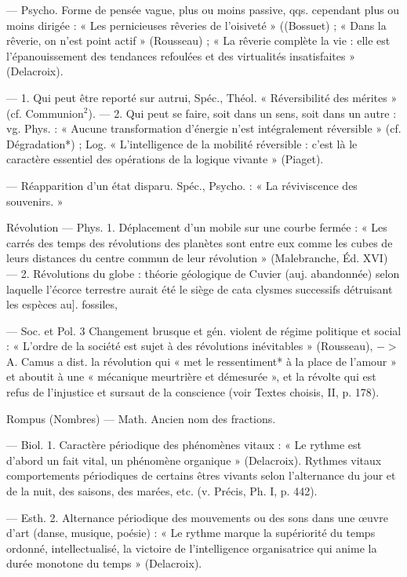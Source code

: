 \begin{itemize}[leftmargin=1cm, label=, itemsep=1pt]
 — Psycho. Forme de pensée
vague, plus ou moins passive, qqs.
cependant plus ou moins dirigée :
« Les pernicieuses rêveries de l'oisiveté » ((Bossuet) ; « Dans la rêverie,
on n’est point actif » (Rousseau) ;
« La rêverie complète la vie : elle est
l'épanouissement des tendances refoulées et des virtualités insatisfaites » (Delacroix).

 — 1. Qui peut être reporté
sur autrui, Spéc., Théol. « Réversibilité des mérites » (cf. Communion$^2$). — 2. Qui peut se faire, soit
dans un sens, soit dans un autre :
vg. Phys. : « Aucune transformation
d'énergie n’est intégralement réversible » (cf. Dégradation*) ; Log.
« L'intelligence de la mobilité réversible : c’est là le caractère essentiel
des opérations de la logique vivante » (Piaget).

 — Réapparition d’un
état disparu. Spéc., Psycho. : « La
réviviscence des souvenirs. »

Révolution\ib{} — Phys. 1. Déplacement
d’un mobile sur une courbe fermée :
« Les carrés des temps des révolutions des planètes sont entre eux
comme les cubes de leurs distances
du centre commun de leur révolution » (Malebranche, Éd. XVI)
— 2. Révolutions du globe : théorie
géologique de Cuvier (auj. abandonnée) selon laquelle l'écorce terrestre aurait été le siège de cata
clysmes successifs détruisant les
espèces au]. fossiles,

— Soc. et Pol. 3 Changement
brusque et gén. violent de régime
politique et social : « L’ordre de la
société est sujet à des révolutions
inévitables » (Rousseau), $->$
A. Camus a dist. la révolution qui
« met le ressentiment* à la place de
l'amour » et aboutit à une « mécanique meurtrière et démesurée », et
la révolte qui est refus de l'injustice
et sursaut de la conscience (voir
Textes choisis, II, p. 178).

Rompus (Nombres)\ib{} — Math. Ancien
nom des fractions.

 — Biol. 1. Caractère périodique des phénomènes vitaux : « Le
rythme est d’abord un fait vital, un
phénomène organique » (Delacroix).
Rythmes vitaux comportements
périodiques de certains êtres vivants
selon l’alternance du jour et de la
nuit, des saisons, des marées, etc.
(v. Précis, Ph. I, p. 442).

— Esth. 2. Alternance périodique des mouvements ou des sons
dans une œuvre d’art (danse, musique, poésie) : « Le rythme marque
la supériorité du temps ordonné,
intellectualisé, la victoire de l’intelligence organisatrice qui anime la
durée monotone du temps » (Delacroix).

	\end{itemize}
